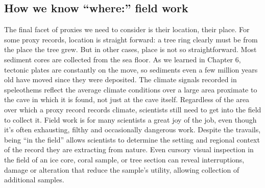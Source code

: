 \subsection{How we know ``where:'' field work}
The final facet of proxies we need to consider is their location, their place. For some proxy records, location is straight forward: a tree ring clearly must be from the place the tree grew. But in other cases, place is not so straightforward. Most sediment cores are collected from the sea floor. As we learned in Chapter 6, tectonic plates are constantly on the move, so sediments even a few million years old have moved since they were deposited. The climate signals recorded in speleothems reflect the average climate conditions over a large area proximate to the cave in which it is found, not just at the cave itself. Regardless of the area over which a proxy record records climate, scientists still need to get into the field to collect it. Field work is for many scientists a great joy of the job, even though it's often exhausting, filthy and occasionally dangerous work. Despite the travails, being ``in the field'' allows scientists to determine the setting and regional context of the record they are extracting from nature. Even cursory visual inspection in the field of an ice core, coral sample, or tree section can reveal interruptions, damage or alteration that reduce the sample's utility, allowing collection of additional samples.\\ 


